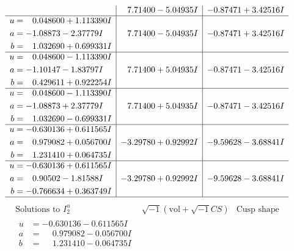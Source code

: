 \documentclass[1p]{elsarticle_modified}
\theoremstyle{definition}
\newcommand{\I}{\sqrt{-1}}
\begin{document}
$$\begin{array}{c|c|c}
 & \phantom{-}7.71400 - 5.04935 I & -0.87471 + 3.42516 I \\ \hline\begin{aligned}
u &= \phantom{-}0.048600 + 1.113390 I \\
a &= -1.08873 - 2.37779 I \\
b &= \phantom{-}1.032690 + 0.699331 I\end{aligned}
 & \phantom{-}7.71400 - 5.04935 I & -0.87471 + 3.42516 I \\ \hline\begin{aligned}
u &= \phantom{-}0.048600 - 1.113390 I \\
a &= -1.10147 - 1.83797 I \\
b &= \phantom{-}0.429611 + 0.922254 I\end{aligned}
 & \phantom{-}7.71400 + 5.04935 I & -0.87471 - 3.42516 I \\ \hline\begin{aligned}
u &= \phantom{-}0.048600 - 1.113390 I \\
a &= -1.08873 + 2.37779 I \\
b &= \phantom{-}1.032690 - 0.699331 I\end{aligned}
 & \phantom{-}7.71400 + 5.04935 I & -0.87471 - 3.42516 I \\ \hline\begin{aligned}
u &= -0.630136 + 0.611565 I \\
a &= \phantom{-}0.979082 + 0.056700 I \\
b &= \phantom{-}1.231410 + 0.064735 I\end{aligned}
 & -3.29780 + 0.92992 I & -9.59628 - 3.68841 I \\ \hline\begin{aligned}
u &= -0.630136 + 0.611565 I \\
a &= \phantom{-}0.90502 - 1.81588 I \\
b &= -0.766634 + 0.363749 I\end{aligned}
 & -3.29780 + 0.92992 I & -9.59628 - 3.68841 I\\
 \hline 
 \end{array}$$\newpage$$\begin{array}{c|c|c}  
\text{Solutions to }I^u_{2}& \I (\text{vol} + \sqrt{-1}CS) & \text{Cusp shape}\\
 \hline 
\begin{aligned}
u &= -0.630136 - 0.611565 I \\
a &= \phantom{-}0.979082 - 0.056700 I \\
b &= \phantom{-}1.231410 - 0.064735 I\end{aligned}

\end{array}$$
\end{document}
